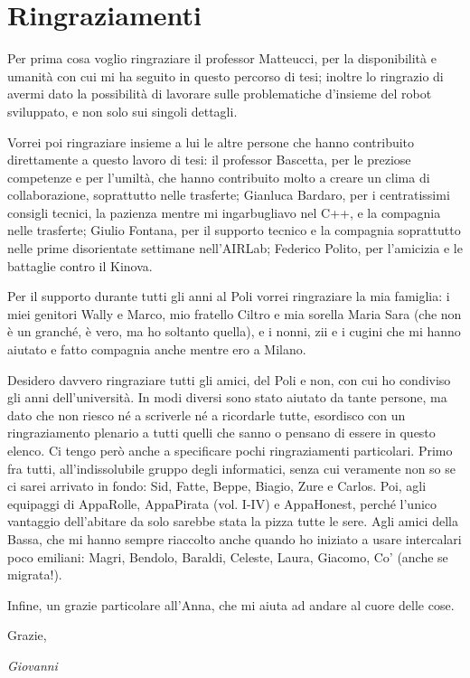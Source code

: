 
\bigskip

\begingroup
\let\clearpage\relax
\let\cleardoublepage\relax
\let\cleardoublepage\relax
\chapter*{Ringraziamenti}
Per prima cosa voglio ringraziare il professor Matteucci, per la disponibilità e umanità con cui mi ha seguito in questo percorso di tesi; inoltre lo ringrazio di avermi dato la possibilità di lavorare sulle problematiche d'insieme del robot sviluppato, e non solo sui singoli dettagli.
\par Vorrei poi ringraziare insieme a lui le altre persone che hanno contribuito direttamente a questo lavoro di tesi: il professor Bascetta, per le preziose competenze e per l'umiltà, che hanno contribuito molto a creare un clima di collaborazione, soprattutto nelle trasferte; Gianluca Bardaro, per i centratissimi consigli tecnici, la pazienza mentre mi ingarbugliavo nel C++, e la compagnia nelle trasferte; Giulio Fontana, per il supporto tecnico e la compagnia soprattutto nelle prime disorientate settimane nell'AIRLab; Federico Polito, per l'amicizia e le battaglie contro il Kinova.
\par Per il supporto durante tutti gli anni al Poli vorrei ringraziare la mia famiglia: i miei genitori Wally e Marco, mio fratello Ciltro e mia sorella Maria Sara (che non è un granché, è vero, ma ho soltanto quella), e i nonni, zii e i cugini che mi hanno aiutato e fatto compagnia anche mentre ero a Milano. 
\par Desidero davvero ringraziare tutti gli amici, del Poli e non, con cui ho condiviso gli anni dell'università. In modi diversi sono stato aiutato da tante persone, ma dato che non riesco né a scriverle né a ricordarle tutte, esordisco con un ringraziamento plenario a tutti quelli che sanno o pensano di essere in questo elenco. Ci tengo però anche a specificare pochi ringraziamenti particolari. Primo fra tutti, all'indissolubile gruppo degli informatici, senza cui veramente non so se ci sarei arrivato in fondo: Sid, Fatte, Beppe, Biagio, Zure e Carlos.
Poi, agli equipaggi di AppaRolle, AppaPirata (vol. I-IV) e AppaHonest, perché l'unico vantaggio dell'abitare da solo sarebbe stata la pizza tutte le sere. Agli amici della Bassa, che mi hanno sempre riaccolto anche quando ho iniziato a usare intercalari poco emiliani: Magri, Bendolo, Baraldi, Celeste, Laura, Giacomo, Co' (anche se migrata!).
\par Infine, un grazie particolare all'Anna, che mi aiuta ad andare al cuore delle cose.
\par Grazie,
\begin{flushright}
\textit{Giovanni}
\end{flushright}


\endgroup